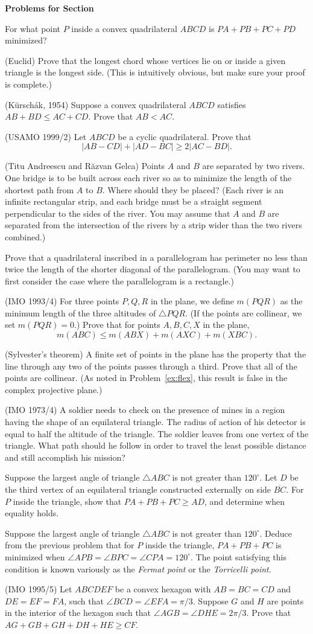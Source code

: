 \documentclass[12pt]{book}
\newcounter{exc}
\numberwithin{exc}{section}
\numberwithin{figure}{section}
\newenvironment{exer}{\vspace{0.1in}
\noindent \textbf{Problems for Section~\thesection} \vspace{0.1in}
\begin{list}{\arabic{exc}.}{\usecounter{exc}}}{\end{list}}
\numberwithin{equation}{theorem}
\def\ii{\item}
\def\ang{\angle}
\def\seg#1{\overline{#1}}
\begin{document}
\begin{exer}
\ii
For what point $P$ inside a convex quadrilateral $ABCD$ is 
$PA+PB+PC+PD$ minimized?
\ii
(Euclid) Prove that the longest chord whose vertices lie on or 
inside a given triangle is the longest side. (This is intuitively
obvious, but make sure your proof is complete.)
\ii
(K\"ursch\'ak, 1954)
Suppose a convex quadrilateral $ABCD$ satisfies $AB+BD \leq AC+CD$.
Prove that $AB < AC$.
\ii (USAMO 1999/2) \label{ex:usamo992}
Let $ABCD$ be a cyclic quadrilateral. Prove that
\[
|AB - CD| + |AD - BC| \geq 2|AC - BD|.
\]
\ii (Titu Andreescu and R\u{a}zvan Gelca) 
Points $A$ and $B$ are separated by two rivers. One bridge is to be 
built across each river so as to minimize the length of the shortest 
path from $A$ to $B$. Where should they be placed? (Each river is an 
infinite rectangular strip, and each bridge must be a straight segment 
perpendicular to the sides of the river. You may assume that $A$ and 
$B$ are separated from the intersection of the rivers by a strip 
wider than the two rivers combined.)
\ii
Prove that a quadrilateral inscribed in a parallelogram
has perimeter no less than twice the length 
of the shorter diagonal of the parallelogram. (You may want to first 
consider the case where the parallelogram is a rectangle.)
\ii
(IMO 1993/4)
For three points $P,Q,R$ in the plane, we define $m(PQR)$ as the minimum 
length of the three altitudes of $\triangle PQR$. (If the points are 
collinear, we set $m(PQR) = 0$.)
Prove that for points $A,B,C,X$ in the plane,
\[
m(ABC) \leq m(ABX) + m(AXC) + m(XBC).
\]  
\ii (Sylvester's theorem) \label{ex:syl}
A finite set of points in the plane has the property that the line 
through any two of the points passes through a third. Prove that all 
of the points are collinear. (As noted in Problem~\ref{ex:flex}, 
this result is false in the complex projective plane.)
\ii (IMO 1973/4)
A soldier needs to check on the presence of mines in a region having 
the shape of an equilateral triangle. The radius of action of his 
detector is equal to half the altitude of the triangle. The soldier 
leaves from one vertex of the triangle. What path should he follow in 
order to travel the least possible distance and still accomplish his 
mission?
\ii
Suppose the largest angle of triangle $\triangle ABC$ is not greater than 
$120^{\circ}$. 
Let $D$ be the third vertex of an equilateral 
triangle constructed externally on side $\seg{BC}$.
For $P$ inside the triangle, 
show that $PA + PB + PC \geq AD$, and determine when equality holds.
\ii
Suppose the largest angle of triangle $\triangle ABC$ is not greater than 
$120^{\circ}$. 
Deduce from the previous problem that
for $P$ inside the triangle, $PA + PB + PC$ is minimized 
when $\ang APB = \ang BPC = \ang CPA = 120^{\circ}$. The point 
satisfying this condition is known variously as the \emph{Fermat 
point} or the \emph{Torricelli point}.
\ii
(IMO 1995/5)
Let $ABCDEF$ be a convex hexagon with $AB=BC=CD$ and $DE=EF=FA$, such 
that $\angle BCD = \angle EFA = \pi/3$. Suppose $G$ and $H$ are points in 
the interior of the hexagon such that $\angle AGB = \angle DHE = 2\pi/3$. 
Prove that $AG + GB + GH + DH + HE \geq CF$.
\end{exer}
\end{document}

